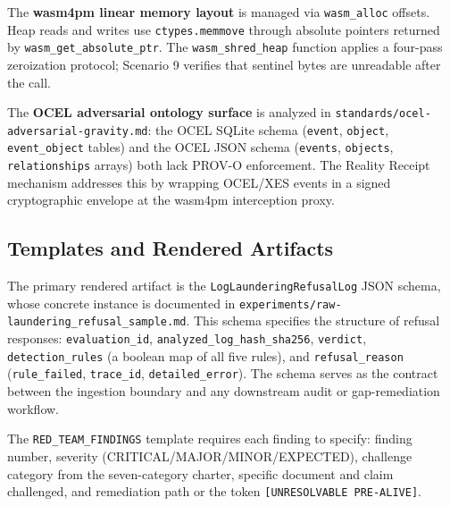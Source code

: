 The \textbf{wasm4pm linear memory layout} is managed via \texttt{wasm\_alloc} offsets.
Heap reads and writes use \texttt{ctypes.memmove} through absolute pointers returned by
\texttt{wasm\_get\_absolute\_ptr}. The \texttt{wasm\_shred\_heap} function applies a
four-pass zeroization protocol; Scenario 9 verifies that sentinel bytes are unreadable after
the call.

The \textbf{OCEL adversarial ontology surface} is analyzed in
\texttt{standards/ocel-adversarial-gravity.md}: the OCEL SQLite schema (\texttt{event},
\texttt{object}, \texttt{event\_object} tables) and the OCEL JSON schema (\texttt{events},
\texttt{objects}, \texttt{relationships} arrays) both lack PROV-O enforcement. The Reality
Receipt mechanism addresses this by wrapping OCEL/XES events in a signed cryptographic
envelope at the wasm4pm interception proxy.

\subsection{Templates and Rendered Artifacts}
\label{sec:adversarial-implementation-templates}

The primary rendered artifact is the \texttt{LogLaunderingRefusalLog} JSON schema, whose
concrete instance is documented in \texttt{experiments/raw-laundering\_refusal\_sample.md}.
This schema specifies the structure of refusal responses: \texttt{evaluation\_id},
\texttt{analyzed\_log\_hash\_sha256}, \texttt{verdict}, \texttt{detection\_rules} (a boolean
map of all five rules), and \texttt{refusal\_reason} (\texttt{rule\_failed},
\texttt{trace\_id}, \texttt{detailed\_error}). The schema serves as the contract between the
ingestion boundary and any downstream audit or gap-remediation workflow.

The \texttt{RED\_TEAM\_FINDINGS} template requires each finding to specify: finding number,
severity (CRITICAL/MAJOR/MINOR/EXPECTED), challenge category from the seven-category charter,
specific document and claim challenged, and remediation path or the token
\texttt{[UNRESOLVABLE PRE-ALIVE]}.
